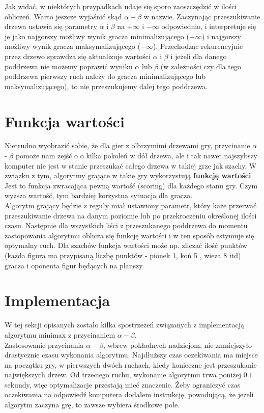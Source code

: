 \documentclass[licencjacka]{pracamgr}
\begin{document}
Jak widać, w niektórych przypadkach udaje się sporo zaoszczędzić w ilości obliczeń.  Warto jeszcze wyjaśnić skąd $\alpha - \beta$ w nazwie. Zaczynając przeszukiwanie drzewa ustawia się parametry $\alpha$ i $\beta$ na $+\infty$ i $-\infty$ odpowiednio, i interpretuje się je jako najgorszy możliwy wynik gracza minimalizującego ($+\infty$) i  najgorszy możliwy wynik gracza maksymalizującego ($-\infty$). Przechodząc rekurencyjnie przez drzewo sprawdza się aktualizuje wartości $\alpha$ i $\beta$ i jeżeli dla danego poddrzewa  nie możemy poprawić wyniku  $\alpha$ lub  $\beta$ (w zależności czy dla tego poddrzewa pierwszy ruch należy do gracza minimalizującego lub maksymalizującego), to nie przeszukujemy dalej tego poddrzewa.


\section{Funkcja wartości}
Nietrudno wyobrazić sobie, że dla gier z olbrzymimi drzewami gry, przycinanie $\alpha$ - $\beta$ pomoże nam zejść o o kilka pokoleń w dół drzewa, ale i tak nawet najszybszy komputer nie jest w stanie przeszukać całego drzewa w takiej grze jak szachy. W związku z tym,  algorytmy grające w takie gry wykorzystują \textbf{funkcję wartości}. Jest to funkcja zwracająca pewną wartość (scoring) dla każdego stanu gry. Czym wyższa wartość, tym bardziej korzystna sytuacja dla gracza. \\

Algorytm grający będzie z reguły miał ustawiony parametr, który każe przerwać przeszukiwanie drzewa na danym poziomie lub po przekroczeniu określonej ilości czasu. Następnie dla wszystkich liści z przeszukanego poddrzewa do momentu zastopowania algorytmu oblicza się funkcję wartości i w ten sposób estymuje się optymalny ruch.  Dla szachów funkcja wartości może np. zliczać ilość punktów (każda figura ma przypisaną liczbę punktów - pionek 1, koń 5 , wieża 8 itd)  gracza i oponenta figur będących na planszy. 


\section{Implementacja}
 W tej sekcji opisanych zostało  kilka spostrzeżeń związanych z implementacją algorytmu minimax z przycinaniem $\alpha - \beta$.\\

Zastosowanie przycinania $\alpha - \beta$, wbrew pokładnych nadziejom, nie zmniejszyło drastycznie  czasu wykonania algorytmu. Najdłuższy czas oczekiwania ma miejsce na początku gry, w pierwszych dwóch ruchach,  kiedy konieczne jest przeszukanie największych drzew. Od trzeciego ruchu, wykonanie algorytmu trwa poniżej $0.1$ sekundy, więc optymalizacje przestają mieć znaczenie.  Żeby ograniczyć czas oczekiwania na odpowiedź komputera dodałem instrukcję, powodującą, że jeżeli algorytm zaczyna grę, to zawsze wybiera środkowe pole.\\
\end{document}
